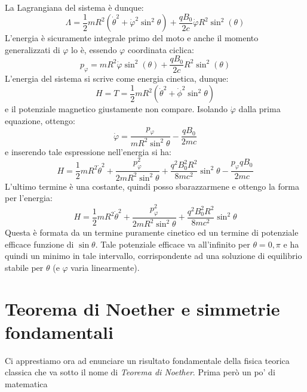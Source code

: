 \documentclass[a4paper,openany]{article}
\begin{document}
	La Lagrangiana del sistema è dunque:
	\begin{equation}
		\Lambda = \dfrac{1}{2}mR^2(\dot{\theta}^2+\dot{\varphi}^2\sin^2\theta) + \dfrac{qB_0}{2c}\dot{\varphi}R^2\sin^2(\theta)
	\end{equation}
	L'energia è sicuramente integrale primo del moto e anche il momento generalizzati di $\varphi$ lo è, essendo $\varphi$ coordinata ciclica:
	$$
	p_\varphi = mR^2\dot{\varphi}\sin^2(\theta) + \dfrac{qB_0}{2c}R^2\sin^2(\theta)
	$$
	L'energia del sistema si scrive come energia cinetica, dunque:
	$$
	H = T = \dfrac{1}{2}mR^2(\dot{\theta}^2+\dot{\phi}^2\sin^2\theta)
	$$
	e il potenziale magnetico giustamente non compare. Isolando $\dot{\varphi}$ dalla prima equazione, ottengo:
	$$
	\dot{\varphi} = \dfrac{p_{\varphi}}{mR^2\sin^2\theta} - \dfrac{qB_0}{2mc}
	$$
	e inserendo tale espressione nell'energia si ha:
	$$
	H = \dfrac{1}{2}mR^2\dot{\theta}^2 + \dfrac{p_\varphi^2}{2mR^2\sin^2\theta} + \dfrac{q^2B_{0}^{2}R^2}{8mc^2}\sin^2\theta - \dfrac{p_\varphi q B_0}{2mc}
	$$
	L'ultimo termine è una costante, quindi posso sbarazzarmene e ottengo la forma per l'energia:
	\begin{equation}
		H = \dfrac{1}{2}mR^2\dot{\theta}^2 + \dfrac{p_\varphi^2}{2mR^2\sin^2\theta} + \dfrac{q^2B_{0}^{2}R^2}{8mc^2}\sin^2\theta
	\end{equation}
	Questa è formata da un termine puramente cinetico ed un termine di potenziale efficace funzione di $\sin\theta$. Tale potenziale efficace va all'infinito per $\theta=0,\pi$ e ha quindi un minimo in tale intervallo, corrispondente ad una soluzione di equilibrio stabile per $\theta$ (e $\varphi$ varia linearmente).
	\newpage
	\section{Teorema di Noether e simmetrie fondamentali}
	Ci apprestiamo ora ad enunciare un risultato fondamentale della fisica teorica classica che va sotto il nome di \textit{Teorema di Noether}. Prima però un po' di matematica
\end{document}

